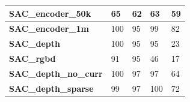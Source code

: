 \begin{table}[!htbp]
\begin{tabular}{|l|l|l|l|l|}
    \textbf{SAC\_encoder\_50k}    & 65                                                                                          & 62                                                                                         & 63                                                                                          & 59                                                                                         \\ \hline
    \textbf{SAC\_encoder\_1m}     & 100                                                                                         & 95                                                                                         & 99                                                                                          & 82                                                                                         \\ \hline
    \textbf{SAC\_depth}           & 100                                                                                         & 95                                                                                         & 95                                                                                          & 23                                                                                         \\ \hline
    \textbf{SAC\_rgbd}            & 91                                                                                          & 95                                                                                         & 46                                                                                          & 17                                                                                         \\ \hline
    \textbf{SAC\_depth\_no\_curr} & 100                                                                                         & 97                                                                                         & 97                                                                                          & 64                                                                                         \\ \hline
    \textbf{SAC\_depth\_sparse}   & 99                                                                                          & 97                                                                                         & 100                                                                                         & 72                                                                                         \\ \hline

\end{tabular}
\end{table}
